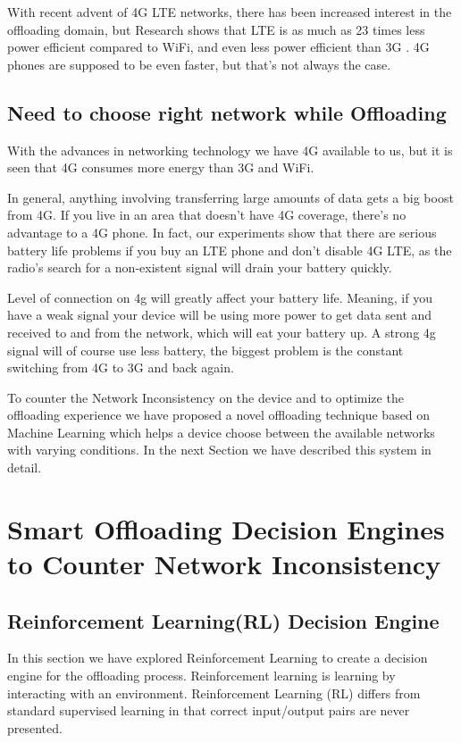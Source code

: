 \documentclass[12pt, twocolumn]{article}
\begin{document}
With recent advent of 4G LTE networks, there has been increased interest in the offloading domain, but Research shows that LTE is as much as 23 times less power efficient compared to WiFi, and even less power efficient than 3G \cite{huang2012close}.
4G phones are supposed to be even faster, but that's not always the case.

\section{Need to choose right network while Offloading}
With the advances in networking technology we have 4G available to us, but it is seen that 4G consumes more energy than 3G and WiFi.

In general, anything involving transferring large amounts of data gets a big boost from 4G. If you live in an area that doesn't have 4G coverage, there's no advantage to a 4G phone. In fact, our experiments show that there are serious battery life problems if you buy an LTE phone and don't disable 4G LTE, as the radio's search for a non-existent signal will drain your battery quickly.

Level of connection on 4g will greatly affect your battery life. Meaning, if you have a weak signal your device will be using more power to get data sent and received to and from the network, which will eat your battery up. A strong 4g signal will of course use less battery, the biggest problem is the constant switching from 4G to 3G and back again.


To counter the Network Inconsistency on the device and to optimize the offloading experience we have proposed a novel offloading technique based on Machine Learning which helps a device choose between the available networks with varying conditions. In the next Section we have described this system in detail.

\chapter{Smart Offloading Decision Engines to Counter Network Inconsistency}

\section{Reinforcement Learning(RL) Decision Engine}
In this section we have explored Reinforcement Learning to create a decision engine for the offloading
process. Reinforcement learning is learning by interacting with an environment. Reinforcement Learning
(RL) differs from standard supervised learning in that correct input/output pairs are never presented.
\end{document}
